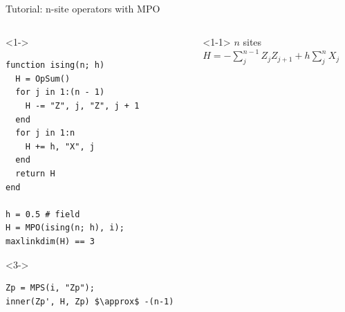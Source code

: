\begin{frame}[fragile]{Tutorial: n-site operators with MPO}

\begin{columns}

\begin{column}{5cm}

\begin{onlyenv}<1->
\begin{lstlisting}[language=JuliaLocal, style=julia, mathescape, basicstyle=\scriptsize\ttfamily]
function ising(n; h)
  H = OpSum()
  for j in 1:(n - 1)
    H -= "Z", j, "Z", j + 1
  end
  for j in 1:n
    H += h, "X", j
  end
  return H
end

h = 0.5 # field
H = MPO(ising(n; h), i);
maxlinkdim(H) == 3
\end{lstlisting}
\end{onlyenv}

\begin{onlyenv}<3->
\begin{lstlisting}[language=JuliaLocal, style=julia, mathescape, basicstyle=\scriptsize\ttfamily]
Zp = MPS(i, "Zp");
inner(Zp', H, Zp) $\approx$ -(n-1)
 \end{lstlisting}
\end{onlyenv}

\end{column}

\begin{column}{5.5cm}

\begin{onlyenv}<1-1>
$n$ sites \\
$H = -\sum_j^{n-1} Z_j Z_{j+1} + h \sum_j^n X_j$ \\
~\\
~\\
~\\
~\\
~\\
~\\
~\\
~\\
\end{onlyenv}


\end{column}
\end{columns}
\end{frame}
